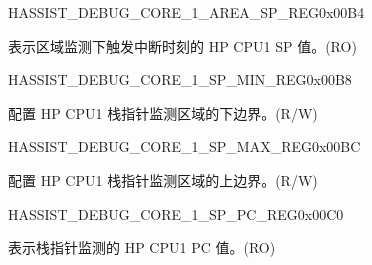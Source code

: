 \begin{register}{H}{ASSIST\_DEBUG\_CORE\_1\_AREA\_SP\_REG}{0x00B4}\label{regdesc:ASSISTDEBUGCORE1AREASPREG}
%
\regnewline%
\begin{regdesc}\begin{reglist}
\label{fielddesc:ASSISTDEBUGCORE1AREASP}\item [ASSIST\_DEBUG\_CORE\_1\_AREA\_SP] 表示区域监测下触发中断时刻的 HP CPU1 SP 值。(RO)
\end{reglist}\end{regdesc}
\end{register}


\begin{register}{H}{ASSIST\_DEBUG\_CORE\_1\_SP\_MIN\_REG}{0x00B8}\label{regdesc:ASSISTDEBUGCORE1SPMINREG}
%
\regnewline%
\begin{regdesc}\begin{reglist}
\label{fielddesc:ASSISTDEBUGCORE1SPMIN}\item [ASSIST\_DEBUG\_CORE\_1\_SP\_MIN] 配置 HP CPU1 栈指针监测区域的下边界。(R/W)
\end{reglist}\end{regdesc}
\end{register}


\begin{register}{H}{ASSIST\_DEBUG\_CORE\_1\_SP\_MAX\_REG}{0x00BC}\label{regdesc:ASSISTDEBUGCORE1SPMAXREG}
%
\regnewline%
\begin{regdesc}\begin{reglist}
\label{fielddesc:ASSISTDEBUGCORE1SPMAX}\item [ASSIST\_DEBUG\_CORE\_1\_SP\_MAX] 配置 HP CPU1 栈指针监测区域的上边界。(R/W)
\end{reglist}\end{regdesc}
\end{register}


\begin{register}{H}{ASSIST\_DEBUG\_CORE\_1\_SP\_PC\_REG}{0x00C0}\label{regdesc:ASSISTDEBUGCORE1SPPCREG}
%
\regnewline%
\begin{regdesc}\begin{reglist}
\label{fielddesc:ASSISTDEBUGCORE1SPPC}\item [ASSIST\_DEBUG\_CORE\_1\_SP\_PC] 表示栈指针监测的 HP CPU1 PC 值。(RO)
\end{reglist}\end{regdesc}
\end{register}


